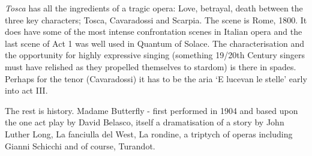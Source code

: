 \textit{Tosca} has all the ingredients of a tragic opera: Love, betrayal, death between the three key characters; Tosca, Cavaradossi and Scarpia. The scene is Rome, 1800. It does have some of the most intense confrontation scenes in Italian opera and the last scene of Act 1 was well used in Quantum of Solace. The characterisation and the opportunity for highly expressive singing (something 19/20th Century singers must have relished as they propelled themselves to stardom) is there in spades. Perhaps for the tenor (Cavaradossi) it has to be the aria `E lucevan le stelle' early into act III. 

The rest is history. Madame Butterfly - first performed in 1904 and based upon the one act play by David Belasco, itself a dramatisation of a story by John Luther Long, La fanciulla del West, La rondine, a triptych of operas including Gianni Schicchi and of course, Turandot.
  









